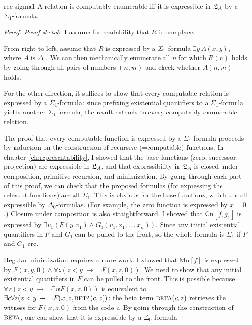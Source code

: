\begin{theorem}{}{rec-sigma1}
  A relation is computably enumerable iff it is expressible in $\mathfrak{L}_A$ by a $\Sigma_{1}$-formula.
\end{theorem}
\begin{proof}
  \emph{Proof sketch.}
  I assume for readability that $R$ is one-place.
  
  From right to left,
  assume that $R$ is expressed by a $\Sigma_{1}$-formula $\exists y \, A(x,y)$,
  where $A$ is $\Delta_{0}$.
  We can then mechanically enumerate all $n$ for which $R(n)$ holds by
  going through all pairs of numbers $(n,m)$ and check whether $A(n,m)$ holds.

  For the other direction,
  it suffices to show that every computable relation is expressed by a $\Sigma_{1}$-formula:
  since prefixing existential quantifiers to a $\Sigma_{1}$-formula yields another $\Sigma_{1}$-formula,
  the result extends to every computably enumerable relation.

  The proof that every computable function is expressed by a $\Sigma_{1}$-formula
  proceeds by induction on the construction of recursive (=computable) functions.
  In chapter~\ref{ch:representability},
  I showed that the base functions (zero, successor, projection) are expressible in $\mathfrak{L}_A$,
  and that expressibility-in-$\mathfrak{L}_A$ is closed under composition, primitive recursion, and minimization.
  By going through each part of this proof,
  we can check that
  the proposed formulas (for expressing the relevant functions) are all $\Sigma_{1}$.
  This is obvious for the base functions,
  which are all expressible by $\Delta_{0}$-formulas.
  (For example, the zero function is expressed by $x = 0$.)
  Closure under composition is also straightforward.
  I showed that
  $\mathrm{Cn}[f,g_1]$ is expressed
  by $\exists v_1(F(y,v_1) \land G_1(v_1,x_1,\ldots,x_n))$.
  Since any initial existential quantifiers in $F$ and $G_1$
  can be pulled to the front,
  so the whole formula is $\Sigma_{1}$ if $F$ and $G_1$ are.

  Regular minimization requires a more work.
  I showed that $\mathrm{Mn}[f]$ is expressed by
  $F(x,y,0) \land \forall z(z < y \;\to\; \neg F(x,z,0))$.
  We need to show that any initial existential quantifiers in $F$
  can be pulled to the front.
  This is possible because
  $\forall z(z < y \;\to\; \neg \exists wF(x,z,0))$
  is equivalent to $\exists c \forall z(z < y \;\to\; \neg F(x,z,\smallcaps{beta}(c,z))$:
  the beta term $\smallcaps{beta}(c,z)$ retrieves the witness for $F(x,z,0)$ from the code $c$.
  By going through the construction of $\smallcaps{beta}$,
  one can show that it is expressible by a $\Delta_{0}$-formula.


\end{proof}
